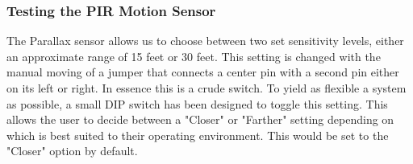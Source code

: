 \subsubsection{Testing the PIR Motion Sensor}
\par The Parallax sensor allows us to choose between two set sensitivity levels, either an approximate range of 15 feet or 30 feet. This setting is changed with the manual moving of a jumper that connects a center pin with a second pin either on its left or right. In essence this is a crude switch. To yield as flexible a system as possible, a small DIP switch has been designed to toggle this setting. This allows the user to decide between a "Closer" or "Farther" setting depending on which is best suited to their operating environment. This would be set to the "Closer" option by default. 